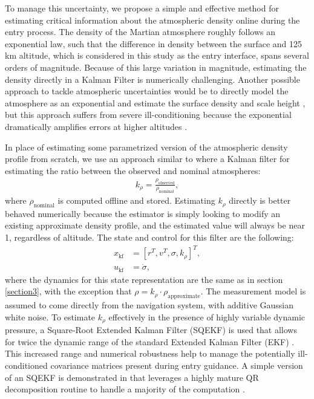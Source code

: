 To manage this uncertainty, we propose a simple and effective method for estimating critical information about the atmospheric density online during the entry process. The density of the Martian atmosphere roughly follows an exponential law, such that the difference in density between the surface and 125 km altitude, which is considered in this study as the entry interface, spans several orders of magnitude. Because of this large variation in magnitude, estimating the density directly in a Kalman Filter is numerically challenging. Another possible approach to tackle atmospheric uncertainties would be to directly model the atmosphere as an exponential and estimate the surface density and scale height \cite{markley2014}, but this approach suffers from severe ill-conditioning because the exponential dramatically amplifies errors at higher altitudes \cite{heidrich2021,dutta2014}. 

In place of estimating some parametrized version of the atmospheric density profile from scratch, we use an approach similar to \cite{roelke2009} where a Kalman filter for estimating the ratio between the observed and nominal atmospheres:
\begin{align}
    k_\rho = \frac{\rho_\text{observed}}{\rho_\text{nominal}},
\end{align}
where $\rho_\text{nominal}$ is computed offline and stored. Estimating $k_\rho$ directly is better behaved numerically because the estimator is simply looking to modify an existing approximate density profile, and the estimated value will always be near 1, regardless of altitude. The state and control for this filter are the following:
\begin{align}
    x_\text{kf} &= [r^T, v^T, \sigma, k_\rho]^T, \\ 
    u_\text{kf} &= \dot{\sigma},
\end{align}
where the dynamics for this state representation are the same as in section \ref{section3}, with the exception that $\rho = k_\rho \cdot \rho_\text{approximate}$. The measurement model is assumed to come directly from the navigation system, with additive Gaussian white noise. To estimate $k_\rho$ effectively in the presence of highly variable dynamic pressure, a Square-Root Extended Kalman Filter (SQEKF) is used that allows for twice the dynamic range of the standard Extended Kalman Filter (EKF) \cite{kaminski1971}. This increased range and numerical robustness help to manage the potentially ill-conditioned covariance matrices present during entry guidance. A simple version of an SQEKF is demonstrated in \cite{tracy2022f} that leverages a highly mature QR decomposition routine to handle a majority of the computation \cite{strang1968}.

